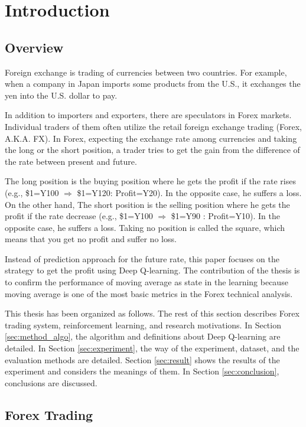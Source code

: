 \chapter{Introduction}
\section{Overview}
Foreign exchange is trading of currencies between two countries. For example, when a company in Japan imports some products from the U.S., it exchanges the yen into the U.S. dollar to pay.

In addition to importers and exporters, there are speculators in Forex markets. Individual traders of them often utilize the retail foreign exchange trading (Forex, A.K.A. FX). In Forex, expecting the exchange rate among currencies and taking the long or the short position, a trader tries to get the gain from the difference of the rate between present and future.

The long position is the buying position where he gets the profit if the rate rises (e.g., \$1=Y\llap{=}100 $\Longrightarrow$ \$1=Y\llap{=}120: Profit=Y\llap{=}20). In the opposite case, he suffers a loss. On the other hand, The short position is the selling position where he gets the profit if the rate decrease (e.g., \$1=Y\llap{=}100 $\Longrightarrow$ \$1=Y\llap{=}90 : Profit=Y\llap{=}10). In the opposite case, he suffers a loss. Taking no position is called the square, which means that you get no profit and suffer no loss.

Instead of prediction approach for the future rate, this paper focuses on the strategy to get the profit using Deep Q-learning. The contribution of the thesis is to confirm the performance of moving average as state in the learning because moving average is one of the most basic metrics in the Forex technical analysis.

This thesis has been organized as follows. The rest of this section describes Forex trading system, reinforcement learning, and research motivations. In Section \ref{sec:method_algo}, the algorithm and definitions about Deep Q-learning are detailed. In Section \ref{sec:experiment}, the way of the experiment, dataset, and the evaluation methods are detailed. Section \ref{sec:result} shows the results of the experiment and considers the meanings of them. In Section \ref{sec:conclusion}, conclusions are discussed.

\section{Forex Trading}
